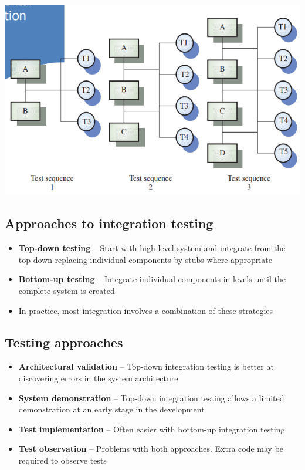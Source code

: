 \documentclass{article}
\begin{document}
\begin{center}
  \includegraphics[scale=0.5]{inc_integration_testing.png}
\end{center}

\subsection{Approaches to integration testing}

\begin{itemize}
  \item \textbf{Top-down testing} – Start with high-level system and integrate from the top-down replacing individual components by stubs where appropriate 
  \item \textbf{Bottom-up testing} – Integrate individual components in levels until the complete system is created 
  \item In practice, most integration involves a combination of these strategies
\end{itemize}

\subsection{Testing approaches}

\begin{itemize}
  \item \textbf{Architectural validation} – Top-down integration testing is better at discovering errors in the system architecture 
  \item \textbf{System demonstration} – Top-down integration testing allows a limited demonstration at an early stage in the development 
  \item \textbf{Test implementation} – Often easier with bottom-up integration testing 
  \item \textbf{Test observation} – Problems with both approaches. Extra code may be required to observe tests
\end{itemize}
\end{document}
